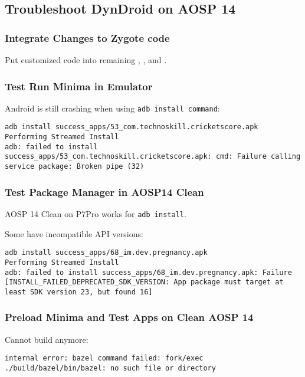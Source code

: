 \subsection{Troubleshoot DynDroid on AOSP 14}
\label{task:20240331_aosp}

\subsubsection{Integrate Changes to Zygote code}

Put customized code into remaining , , and .

\subsubsection{Test Run Minima in Emulator}
Android is still crashing when using \texttt{adb install command}:
\begin{lstlisting}
adb install success_apps/53_com.technoskill.cricketscore.apk 
Performing Streamed Install
adb: failed to install success_apps/53_com.technoskill.cricketscore.apk: cmd: Failure calling service package: Broken pipe (32)
\end{lstlisting}

\subsubsection{Test Package Manager in AOSP14 Clean}

AOSP 14 Clean on P7Pro works for \texttt{adb install}.

Some have incompatible API versions: 
\begin{lstlisting}
adb install success_apps/68_im.dev.pregnancy.apk 
Performing Streamed Install
adb: failed to install success_apps/68_im.dev.pregnancy.apk: Failure [INSTALL_FAILED_DEPRECATED_SDK_VERSION: App package must target at least SDK version 23, but found 16]
\end{lstlisting}

\subsubsection{Preload Minima and Test Apps on Clean AOSP 14}
Cannot build anymore:
\begin{lstlisting}
internal error: bazel command failed: fork/exec ./build/bazel/bin/bazel: no such file or directory
\end{lstlisting}

